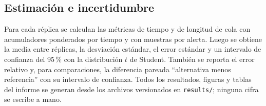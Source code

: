 \subsection{Estimación e incertidumbre}

Para cada réplica se calculan las métricas de tiempo y de longitud de cola con
acumuladores ponderados por tiempo y con muestras por alerta. Luego se obtiene
la media entre réplicas, la desviación estándar, el error estándar y un
intervalo de confianza del 95\,\% con la distribución $t$ de Student. También
se reporta el error relativo y, para comparaciones, la diferencia pareada
``alternativa menos referencia'' con su intervalo de confianza. Todos los
resultados, figuras y tablas del informe se generan desde los archivos
versionados en \texttt{results/}; ninguna cifra se escribe a mano.
